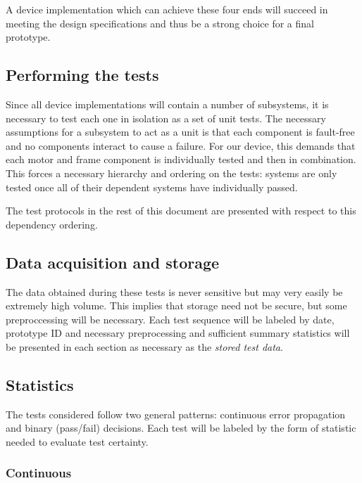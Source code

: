 \documentclass{article}
\begin{document}
A device implementation which can achieve these four ends will succeed
in meeting the design specifications and thus be a strong choice for a
final prototype.

\subsection{Performing the tests}
\label{sec:hierarchical-testing}

Since all device implementations will contain a number of subsystems,
it is necessary to test each one in isolation as a set of unit
tests. The necessary assumptions for a subsystem to act as a unit is
that each component is fault-free and no components interact to cause
a failure. For our device, this demands that each motor and frame
component is individually tested and then in combination. This forces
a necessary hierarchy and ordering on the tests: systems are only
tested once all of their dependent systems have individually passed.

The test protocols in the rest of this document are presented with
respect to this dependency ordering.

\subsection{Data acquisition and storage}
\label{sec:data-acqu-stor}

The data obtained during these tests is never sensitive but may very
easily be extremely high volume. This implies that storage need not be
secure, but some preproccessing will be necessary. Each test sequence
will be labeled by date, prototype ID and necessary preprocessing and
sufficient summary statistics will be presented in each section as
necessary as the \emph{stored test data}.

\subsection{Statistics}
\label{sec:statistics}

The tests considered follow two general patterns: continuous error
propagation and binary (pass/fail) decisions. Each test will be
labeled by the form of statistic needed to evaluate test certainty.

\subsubsection{Continuous}
\label{sec:continuous}
\end{document}
